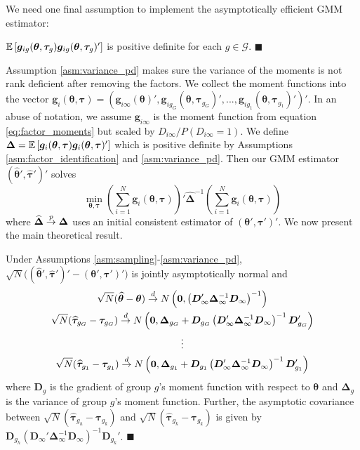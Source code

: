 \documentclass[12pt]{article}
\begin{document}
We need one final assumption to implement the asymptotically efficient GMM estimator:
\begin{assumption}\label{asm:variance_pd}
  $\mathbb{E}\left[\bm g_{ig}(\bm \theta, \bm \tau_g) \bm g_{ig}(\bm \theta, \bm \tau_g)'\right]$ is positive definite for each $g \in \mathcal{G}$. $\blacksquare$
\end{assumption}

Assumption \ref{asm:variance_pd} makes sure the variance of the moments is not rank deficient after removing the factors. We collect the moment functions into the vector $\bm g_i(\bm \theta, \bm \tau) = (\bm g_{i\infty}(\bm \theta)', \bm g_{ig_G}(\bm \theta, \bm \tau_{g_G})',...,\bm g_{ig_1}(\bm \theta, \bm \tau_{g_1})')'$. In an abuse of notation, we assume $\bm g_{i\infty}$ is the moment function from equation \eqref{eq:factor_moments} but scaled by $D_{i\infty} / P(D_{i \infty} = 1)$. We define $\bm \Delta = \mathbb{E}\left[\bm g_i(\bm \theta, \bm \tau) \bm g_i(\bm \theta, \bm \tau)'\right]$ which is positive definite by Assumptions \ref{asm:factor_identification} and \ref{asm:variance_pd}. Then our GMM estimator $(\widehat{ \bm \theta}', \widehat{ \bm \tau}')'$ solves
\begin{equation}\label{eq:minimization_problem}
  \min_{\bm \theta, \bm \tau} \left( \sum_{i = 1}^N \bm g_i(\bm \theta, \bm \tau) \right)' \widehat{\bm \Delta}^{-1} \left( \sum_{i = 1}^N \bm g_i(\bm \theta, \bm \tau) \right)
\end{equation}
where $\widehat{\bm \Delta} \stackrel{p}{\rightarrow} \bm \Delta$ uses an initial consistent estimator of $(\bm \theta', \bm \tau')'$. We now present the main theoretical result. 

\begin{theorem}\label{theorem:asymptotic_distribution}
  Under Assumptions \ref{asm:sampling}-\ref{asm:variance_pd}, $\sqrt{N}\big((\widehat{\bm \theta}', \widehat{\bm \tau}')' - (\bm \theta', \bm \tau')'\big)$ is jointly asymptotically normal and
  \begin{gather*}
    \sqrt{N}(\widehat{\bm \theta} - \bm \theta) \stackrel{d}{\rightarrow} N \left( \bm 0, \left( \bm D'_{\infty} \bm \Delta_{\infty}^{-1} \bm D_{\infty} \right)^{-1} \right) \\
    \sqrt{N}(\widehat{\bm \tau}_{g_G} - \bm \tau_{g_G}) \stackrel{d}{\rightarrow} N \left( \bm 0, \bm \Delta_{g_G} + \bm D_{g_G} \left( \bm D'_{\infty} \bm \Delta_{\infty}^{-1} \bm D_{\infty} \right)^{-1} \bm D_{g_G}'  \right)\\
    \vdots\\
    \sqrt{N}(\widehat{\bm \tau}_{g_1} - \bm \tau_{g_1}) \stackrel{d}{\rightarrow} N \left( \bm 0, \bm \Delta_{g_1} + \bm D_{g_1} \left( \bm D'_{\infty} \bm \Delta_{\infty}^{-1} \bm D_{\infty} \right)^{-1} \bm D_{g_1}' \right)
  \end{gather*}
where $\bm D_g$ is the gradient of group $g$'s moment function with respect to $\bm \theta$ and $\bm \Delta_g$ is the variance of group $g$'s moment function. Further, the asymptotic covariance between $\sqrt{N}(\widehat{\bm \tau}_{g_h} - \bm \tau_{g_k})$ and $\sqrt{N}(\widehat{\bm \tau}_{g_k} - \bm \tau_{g_k})$ is given by $\bm D_{g_h} (\bm D_{\infty}' \bm \Delta_{\infty}^{-1} \bm D_{\infty})^{-1} \bm D_{g_k}'$. $\blacksquare$
\end{theorem}
\end{document}
